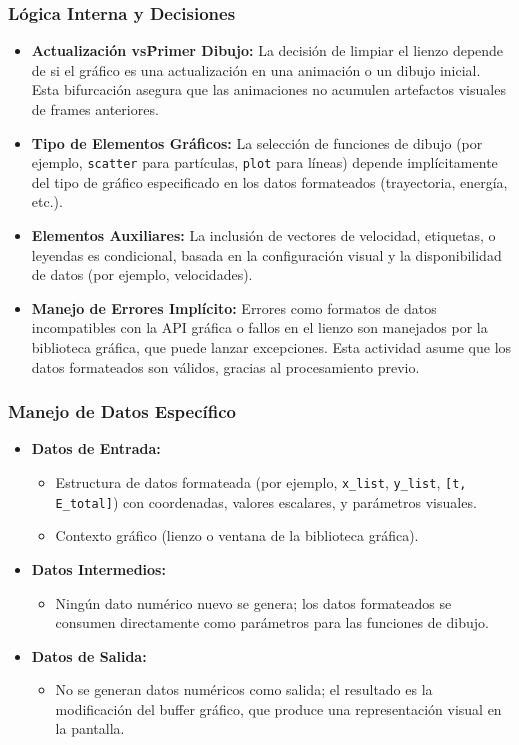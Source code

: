 \subsubsection{Lógica Interna y Decisiones}
\begin{itemize}
    \item \textbf{Actualización vs\. Primer Dibujo:}
    La decisión de limpiar el lienzo depende de si el gráfico es una actualización en una animación o un dibujo inicial. Esta bifurcación asegura que las animaciones no acumulen artefactos visuales de frames anteriores.
    \item \textbf{Tipo de Elementos Gráficos:}
    La selección de funciones de dibujo (por ejemplo, \texttt{scatter} para partículas, \texttt{plot} para líneas) depende implícitamente del tipo de gráfico especificado en los datos formateados (trayectoria, energía, etc.).
    \item \textbf{Elementos Auxiliares:}
    La inclusión de vectores de velocidad, etiquetas, o leyendas es condicional, basada en la configuración visual y la disponibilidad de datos (por ejemplo, velocidades).
    \item \textbf{Manejo de Errores Implícito:}
    Errores como formatos de datos incompatibles con la API gráfica o fallos en el lienzo son manejados por la biblioteca gráfica, que puede lanzar excepciones. Esta actividad asume que los datos formateados son válidos, gracias al procesamiento previo.
\end{itemize}

\subsubsection{Manejo de Datos Específico}
\begin{itemize}
    \item \textbf{Datos de Entrada:}
    \begin{itemize}
        \item Estructura de datos formateada (por ejemplo, \texttt{x\_list}, \texttt{y\_list}, \texttt{[t, E\_total]}) con coordenadas, valores escalares, y parámetros visuales.
        \item Contexto gráfico (lienzo o ventana de la biblioteca gráfica).
    \end{itemize}
    \item \textbf{Datos Intermedios:}
    \begin{itemize}
        \item Ningún dato numérico nuevo se genera; los datos formateados se consumen directamente como parámetros para las funciones de dibujo.
    \end{itemize}
    \item \textbf{Datos de Salida:}
    \begin{itemize}
        \item No se generan datos numéricos como salida; el resultado es la modificación del buffer gráfico, que produce una representación visual en la pantalla.
    \end{itemize}
\end{itemize}

